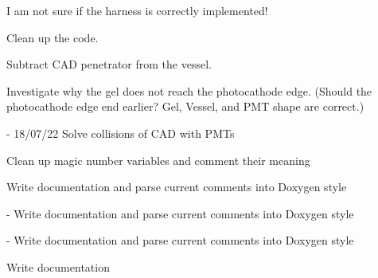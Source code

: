 
\begin{DoxyRefList}
\item[Member \mbox{\hyperlink{class_d_e_g_g_a6af6697e49866ad1c9c15a8182b86cbf}{DEGG\+::DEGG}} (G4bool p\+\_\+place\+Harness=true)]\label{todo__todo000004}%
%

\begin{DoxyItemize}
\item I am not sure if the harness is correctly implemented!
\item Clean up the code.
\item Subtract CAD penetrator from the vessel.
\item Investigate why the gel does not reach the photocathode edge. (Should the photocathode edge end earlier? Gel, Vessel, and PMT shape are correct.)  
\end{DoxyItemize}
\item[Member \mbox{\hyperlink{class_l_o_m16_a93c141790620554394cdf9864096d011}{LOM16\+::$\sim$\+LOM16}} ()]\label{todo__todo000005}%
%
-\/ 18/07/22 Solve collisions of CAD with PMTs
\begin{DoxyItemize}
\item Clean up magic number variables and comment their meaning
\item Write documentation and parse current comments into Doxygen style  
\end{DoxyItemize}
\item[Member \mbox{\hyperlink{classm_d_o_m_afd95205edb92f86b5c8d4e5642a58e3c}{m\+DOM\+::$\sim$m\+DOM}} ()]\label{todo__todo000007}%
%
-\/ Write documentation and parse current comments into Doxygen style  
\item[Member \mbox{\hyperlink{classm_d_o_m_harness_ad83b869a9aa373be038889f61608d3c6}{m\+DOMHarness\+::m\+DOMHarness}} (\mbox{\hyperlink{classm_d_o_m}{m\+DOM}} $\ast$p\+MDOM)]\label{todo__todo000008}%
%
-\/ Write documentation and parse current comments into Doxygen style  
\item[File \mbox{\hyperlink{_o_m_sim_d_e_g_g_harness_8hh}{OMSim\+DEGGHarness.hh}} ]\label{todo__todo000003}%
%
Write documentation



\end{DoxyRefList}
